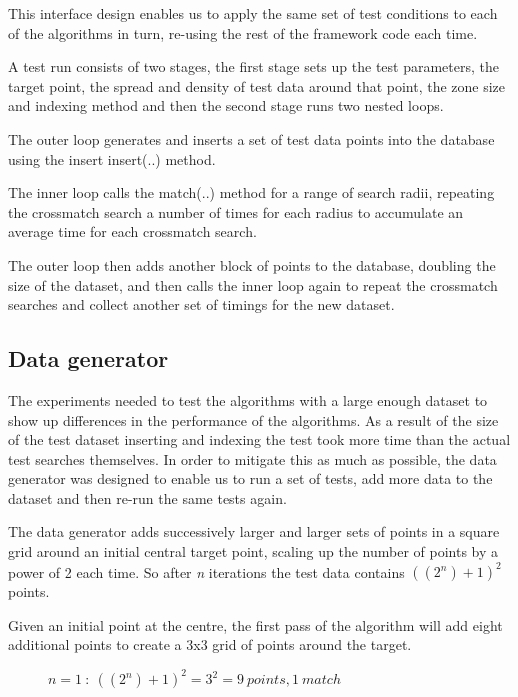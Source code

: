\documentclass{article}
\newcommand{\centre} {centre\xspace}
\newcommand{\crossmatch} {crossmatch\xspace}
\newcommand{\dataset} {dataset\xspace}
\newcommand{\javaname}[1] {{\ttfamily\color{codeblue} #1}}
\begin{document}
This interface design enables us to apply the same set of test conditions to each of the algorithms in turn, re-using the rest of the framework code each time.

A test run consists of two stages, the first stage sets up the test parameters, the target point, the spread and density of test data around that point, the zone size and indexing method and then the second stage runs two nested loops.

The outer loop generates and inserts a set of test data points into the database using the insert \javaname{insert(..)} method.

The inner loop calls the \javaname{match(..)} method for a range of search radii, repeating the \crossmatch search a number of times for each radius to accumulate an average time for each \crossmatch search.

The outer loop then adds another block of points to the database, doubling the size of the \dataset, and then calls the inner loop again to repeat the \crossmatch searches and collect another set of timings for the new \dataset.

\subsection{Data generator}
\label{test-data-generator}

The experiments needed to test the algorithms with a large enough \dataset to show up differences in the performance of the algorithms.
As a result of the size of the test \dataset inserting and indexing the test took more time than the actual test searches themselves.
In order to mitigate this as much as possible, the data generator was designed to enable us to run a set of tests, add more data to the \dataset and then re-run the same tests again.

The data generator adds successively larger and larger sets of points in a square grid around an initial central target point, scaling up the number of points by a power of 2 each time.
So after \textit{n} iterations the test data contains \(((2^n)+1)^2\) points.

Given an initial point at the \centre, the first pass of the algorithm will add eight additional points to create a 3x3 grid of points around the target. 
\begin{figure}[h]

\caption{$n=1 \ :\ ((2^n)+1)^2 = 3^2 = 9 \ points, 1 \ match$}
\label{fig:data-count-01}
\end{figure}
\end{document}

